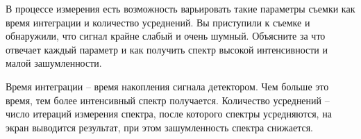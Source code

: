 
В процессе измерения есть возможность варьировать такие параметры съемки как время интеграции и количество усреднений. Вы приступили к съемке и обнаружили, что сигнал крайне слабый и очень шумный. Объясните за что отвечает каждый параметр и как получить спектр высокой интенсивности и малой зашумленности.

\explanationSection

Время интеграции – время накопления сигнала детектором. Чем больше это время, тем более интенсивный спектр получается. Количество усреднений – число итераций измерения спектра, после которого спектры усредняются, на экран выводится результат, при этом зашумленность спектра снижается.